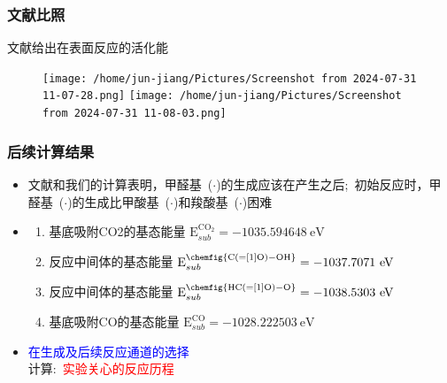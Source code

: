 \begin{frame}
	\frametitle{文献比照}
	文献\cite{ASS603-154398_2022}给出\textrm{}在\textrm{}表面反应的活化能
\begin{figure}[h!]
\centering
\texttt{[image: /home/jun-jiang/Pictures/Screenshot from 2024-07-31 11-07-28.png]}
\texttt{[image: /home/jun-jiang/Pictures/Screenshot from 2024-07-31 11-08-03.png]}
\label{CO2_0n_Ru-CO}
\end{figure}

\end{frame}
\begin{frame}
	\frametitle{后续计算结果}
	\begin{itemize}
		\item 文献和我们的计算表明，甲醛基~\textrm{($\cdot$)}的生成应该在\textrm{}产生之后;~初始反应时，甲醛基~\textrm{($\cdot$)}的生成比甲酸基~\textrm{($\cdot$)}和羧酸基~\textrm{($\cdot$)}困难
		\item 
			\begin{enumerate}
				\item 基底吸附\textrm{CO2}的基态能量 $\mathrm{E}_{sub}^{\mathrm{CO_2}}=-1035.594648~\mathrm{eV}$
				\item 反应中间体的基态能量 $\mathrm{E}_{sub}^{\mathrm{\chemfig{C(=[1]O)-OH}}}=-1037.7071~\mathrm{eV}$
				\item 反应中间体的基态能量 $\mathrm{E}_{sub}^{\mathrm{\chemfig{HC(=[1]O)-O}}}=-1038.5303~\mathrm{eV}$
				\item 基底吸附\textrm{CO}的基态能量 $\mathrm{E}_{sub}^{\mathrm{CO}}=-1028.222503~\mathrm{eV}$
			\end{enumerate}
		\item \textcolor{blue}{在\textrm{}生成及后续反应通道的选择}\\
	计算:~\textcolor{red}{实验关心的反应历程}
	\end{itemize}
\end{frame}
